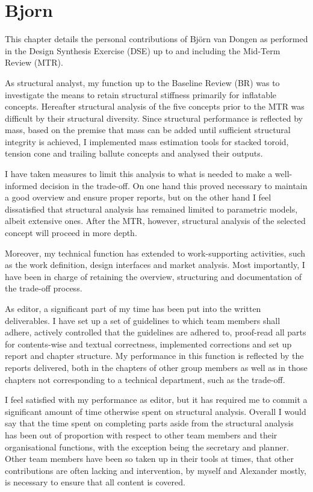 \section{Bjorn}
This chapter details the personal contributions of Bj{\"o}rn van Dongen as performed in the Design Synthesis Exercise (DSE) up to and including the Mid-Term Review (MTR).

As structural analyst, my function up to the Baseline Review (BR) was to investigate the means to retain structural stiffness primarily for inflatable concepts. Hereafter structural analysis of the five concepts prior to the MTR was difficult by their structural diversity. Since structural performance is reflected by mass, based on the premise that mass can be added until sufficient structural integrity is achieved, I implemented mass estimation tools for stacked toroid, tension cone and trailing ballute concepts and analysed their outputs. 

I have taken measures to limit this analysis to what is needed to make a well-informed decision in the trade-off. On one hand this proved necessary to maintain a good overview and ensure proper reports, but on the other hand I feel dissatisfied that structural analysis has remained limited to parametric models, albeit extensive ones. After the MTR, however, structural analysis of the selected concept will proceed in more depth.

Moreover, my technical function has extended to work-supporting activities, such as the work definition, design interfaces and market analysis. Most importantly, I have been in charge of retaining the overview, structuring and documentation of the trade-off process.

As editor, a significant part of my time has been put into the written deliverables. I have set up a set of guidelines to which team members shall adhere, actively controlled that the guidelines are adhered to, proof-read all parts for contents-wise and textual correctness, implemented corrections and set up report and chapter structure. My performance in this function is reflected by the reports delivered, both in the chapters of other group members as well as in those chapters not corresponding to a technical department, such as the trade-off.

I feel satisfied with my performance as editor, but it has required me to commit a significant amount of time otherwise spent on structural analysis. Overall I would say that the time spent on completing parts aside from the structural analysis has been out of proportion with respect to other team members and their organisational functions, with the exception being the secretary and planner. Other team members have been so taken up in their tools at times, that other contributions are often lacking and intervention, by myself and Alexander mostly, is necessary to ensure that all content is covered.

